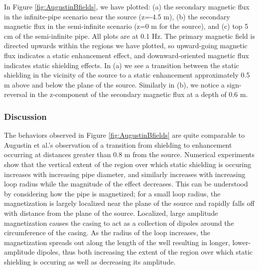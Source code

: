 In Figure \ref{fig:AugustinBfields}, we have plotted: (a) the secondary magnetic flux in the infinite-pipe scenario near the source (z=-4.5 m), (b) the secondary magnetic flux in the semi-infinite scenario (z=0 m for the source), and (c) top 5 cm of the semi-infinite pipe. All plots are at 0.1 Hz. The primary magnetic field is directed upwards within the regions we have plotted, so upward-going magnetic flux indicates a static enhancement effect, and downward-oriented magnetic flux indicates static shielding effects. In (a) we see a transition between the static shielding in the vicinity of the source to a static enhancement approximately 0.5 m above and below the plane of the source. Similarly in (b), we notice a sign-reversal in the z-component of the secondary magnetic flux at a depth of 0.6 m.

\subsubsection{Discussion}
The behaviors observed in Figure \ref{fig:AugustinBfields} are quite comparable to Augustin et al.'s observation of a transition from shielding to enhancement occurring at distances greater than 0.8 m from the source. Numerical experiments show that the vertical extent of the region over which static shielding is occuring increases with increasing pipe diameter, and similarly increases with increasing loop radius while the magnitude of the effect decreases. This can be understood by considering how the pipe is magnetized; for a small loop radius, the magnetization is largely localized near the plane of the source and rapidly falls off with distance from the plane of the source. Localized, large amplitude magnetization causes the casing to act as a collection of dipoles around the circumference of the casing. As the radius of the loop increases, the magnetization spreads out along the length of the well resulting in longer, lower-amplitude dipoles, thus both increasing the extent of the region over which static shielding is occuring as well as decreasing its amplitude.




